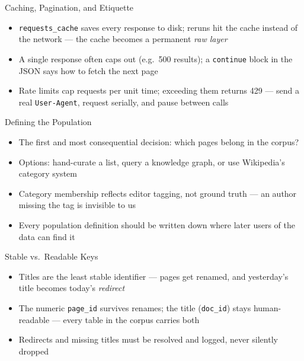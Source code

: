 \documentclass[8pt,aspectratio=169]{beamer}
\begin{document}
\begin{textframe}{Caching, Pagination, and Etiquette}

\begin{itemize}
\item \texttt{requests\_cache} saves every response to disk; reruns hit the cache instead of the network --- the cache becomes a permanent \textit{raw layer}
\item A single response often caps out (e.g.\ 500 results); a \texttt{continue} block in the JSON says how to fetch the next page
\item Rate limits cap requests per unit time; exceeding them returns 429 --- send a real \texttt{User-Agent}, request serially, and pause between calls
\end{itemize}

\end{textframe}

\begin{textframe}{Defining the Population}

\begin{itemize}
\item The first and most consequential decision: which pages belong in the corpus?
\item Options: hand-curate a list, query a knowledge graph, or use Wikipedia's category system
\item Category membership reflects editor tagging, not ground truth --- an author missing the tag is invisible to us
\item Every population definition should be written down where later users of the data can find it
\end{itemize}

\end{textframe}

\begin{textframe}{Stable vs.\ Readable Keys}

\begin{itemize}
\item Titles are the least stable identifier --- pages get renamed, and yesterday's title becomes today's \textit{redirect}
\item The numeric \texttt{page\_id} survives renames; the title (\texttt{doc\_id}) stays human-readable --- every table in the corpus carries both
\item Redirects and missing titles must be resolved and logged, never silently dropped
\end{itemize}

\end{textframe}
\end{document}
